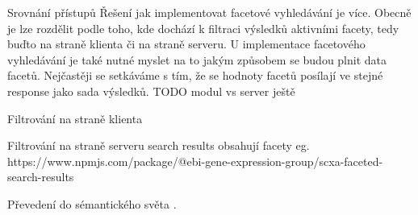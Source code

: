 \sec Srovnání přístupů
Řešení jak implementovat facetové vyhledávání je více. 
Obecně je lze rozdělit podle toho, kde dochází k filtraci výsledků aktivními facety, tedy buďto na straně klienta či na straně serveru.
U implementace facetového vyhledávání je také nutné myslet na to jakým způsobem se budou plnit data facetů. Nejčastěji se setkáváme s tím, že se
hodnoty facetů posílají ve stejné response jako sada výsledků. TODO modul vs server ještě

    \secc Filtrování na straně klienta

    \secc Filtrování na straně serveru
	search results obsahují facety eg. https://www.npmjs.com/package/@ebi-gene-expression-group/scxa-faceted-search-results
	
    \sec Převedení do sémantického světa
	.